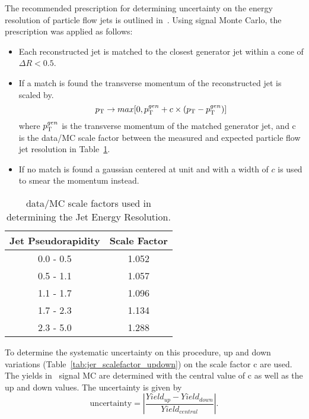 The recommended prescription for determining uncertainty on the energy resolution of particle flow jets is outlined in~\cite{jer_ref}. Using signal Monte Carlo, the prescription was applied as follows:
\begin{itemize}
\item Each reconstructed jet is matched to the closest generator jet within a cone of $\Delta R < 0.5$.
\item If a match is found the transverse momentum of the reconstructed jet is scaled by.
\begin{equation}
p_{\mathrm{T}} \rightarrow max[0, p_{\mathrm{T}} ^{gen} + c \times (p_{\mathrm{T}} - p_{\mathrm{T}} ^{gen})]
\end{equation}
where $p_{\mathrm{T}} ^{gen}$ is the transverse momentum of the matched generator jet, and c is the data/MC scale factor between the measured and expected particle flow jet resolution in Table~\ref{tab:jer_scalefactor}.
\item If no match is found a gaussian centered at unit and with a width of $c$ is used to smear the momentum instead.
\end{itemize}

\begin{table}[h]
\begin{center}

\begin{tabular}{c|c}\hline
Jet Pseudorapidity & Scale Factor \\ \hline \hline
0.0 - 0.5 & 1.052 \\
0.5 - 1.1 & 1.057 \\
1.1 - 1.7 & 1.096 \\
1.7 - 2.3 & 1.134 \\
2.3 - 5.0 & 1.288 \\
\hline
\hline
\end{tabular}
\caption{ \label{tab:jer_scalefactor} data/MC scale factors used in determining the Jet Energy Resolution.}
\end{center}
\end{table}

To determine the systematic uncertainty on this procedure, up and down variations (Table~\ref{tab:jer_scalefactor_updown}) on the scale factor c are used. The yields in \ttZ \ signal MC are determined with the central value of c as well as the up and down values. The uncertainty is given by
\begin{equation}
\mathrm{uncertainty} = | \frac{Yield _{up} - Yield _{down}}{Yield _{central}} |.
\end{equation}

